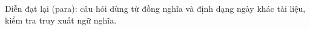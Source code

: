 Diễn đạt lại (para): câu hỏi dùng từ đồng nghĩa và định dạng ngày khác tài liệu, kiểm tra truy xuất ngữ nghĩa.
